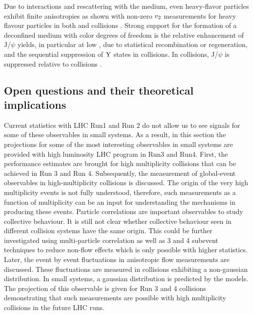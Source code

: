\documentclass[../report.tex]{subfiles}
\begin{document}
Due to interactions and rescattering with the medium, even heavy-flavor particles exhibit finite anisotropies as shown with non-zero $v_{\rm{2}}$ measurements for heavy flavour particles in both \PbPb and \pPb collisions \cite{ALICE:2013xna,Abelev:2013lca,Abelev:2014ipa,Adam:2015pga,Acharya:2017tfn,Adam:2016ssk,ALICE:2016clc,Acharya:2017qps,Sirunyan:2017plt,Acharya:2017tgv,Khachatryan:2016ypw,Acharya:2018dxy,Sirunyan:2018toe}. Strong support for the formation of a deconfined medium with color degrees of freedom is the relative enhancement of J/$\psi$ yields, in particular at low \pt, due to statistical recombination or regeneration, and the sequential suppression of $\rm{Y}$ states in \PbPb collisions. In \pPb collisions, J/$\psi$ is suppressed relative to \pp collisions \cite{Abelev:2012rv,Adam:2015rba,Chatrchyan:2012lxa, Chatrchyan:2013nza, Abelev:2014zpa, Adam:2015jsa, Adam:2016ohd, Adam:2015rta, Adam:2015isa, Adam:2015gba, Adam:2016rdg, Adamova:2017uhu, Acharya:2017tfn, Acharya:2017hjh, Sirunyan:2017lzi, Khachatryan:2016ypw, Sirunyan:2017mzd, Sirunyan:2017isk, Khachatryan:2016xxp, Sirunyan:2016znt, Aaboud:2017cif, Aaij:2017cqq}. 


\subsection{Open questions and their theoretical implications}

Current statistics with LHC Run1 and Run 2 do not allow us to see signals for some of these observables in small systems. As a result, in this section the projections for some of the most interesting observables in small systems are provided with high luminosity LHC program in Run3 and Run4. First, the performance estimates are brought for high multiplicity \pp collisions that can be achieved in Run 3 and Run 4. Subsequently, the measurement of global-event observables in high-multiplicity \pp collisions is discussed. The origin of the very high multiplicity events is not fully understood, therefore, such measurements as a function of multiplicity can be an input for understanding the mechanisms in producing these events. Particle correlations are important observables to study collective behaviour. It is still not clear whether collective behaviour seen in different collision systems have the same origin. This could be further investigated using multi-particle correlation as well as 3 and 4 subevent techniques to reduce non-flow effects which is only possible with higher statistics. Later, the event by event fluctuations in anisotropic flow measurements are discussed. These fluctuations are measured in \PbPb collisions exhibiting a non-gaussian distribution. In small systems, a gaussian distribution is predicted by the models. The projection of this observable is given for Run 3 and 4 \pp collisions demonstrating that such measurements are possible with high multiplicity \pp collisions in the future LHC runs. 
\end{document}
